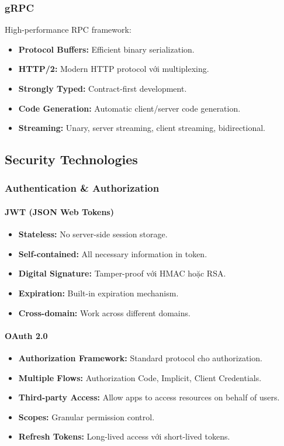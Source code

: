\documentclass[a4paper,12pt]{report}
\begin{document}
\subsubsection{gRPC}
High-performance RPC framework:
\begin{itemize}
    \item \textbf{Protocol Buffers:} Efficient binary serialization.
    \item \textbf{HTTP/2:} Modern HTTP protocol với multiplexing.
    \item \textbf{Strongly Typed:} Contract-first development.
    \item \textbf{Code Generation:} Automatic client/server code generation.
    \item \textbf{Streaming:} Unary, server streaming, client streaming, bidirectional.
\end{itemize}

\subsection{Security Technologies}

\subsubsection{Authentication \& Authorization}

\paragraph{JWT (JSON Web Tokens)}
\begin{itemize}
    \item \textbf{Stateless:} No server-side session storage.
    \item \textbf{Self-contained:} All necessary information in token.
    \item \textbf{Digital Signature:} Tamper-proof với HMAC hoặc RSA.
    \item \textbf{Expiration:} Built-in expiration mechanism.
    \item \textbf{Cross-domain:} Work across different domains.
\end{itemize}

\paragraph{OAuth 2.0}
\begin{itemize}
    \item \textbf{Authorization Framework:} Standard protocol cho authorization.
    \item \textbf{Multiple Flows:} Authorization Code, Implicit, Client Credentials.
    \item \textbf{Third-party Access:} Allow apps to access resources on behalf of users.
    \item \textbf{Scopes:} Granular permission control.
    \item \textbf{Refresh Tokens:} Long-lived access với short-lived tokens.
\end{itemize}
\end{document}
